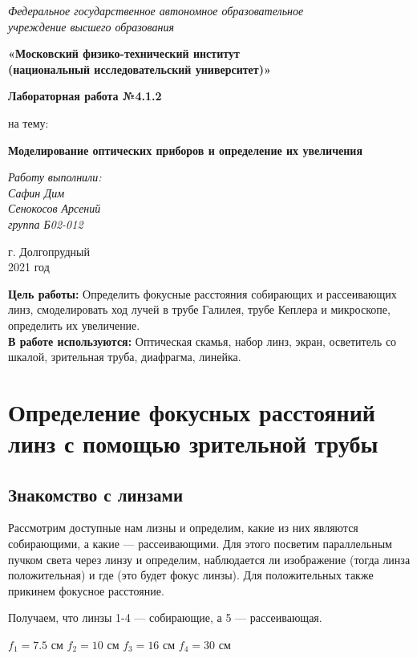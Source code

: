 \documentclass[a4paper,12pt]{article} %
\date{\today}
\begin{document}
 
\begin{titlepage}
\begin{center}
		\textit{\large {Федеральное государственное автономное образовательное\\ учреждение высшего образования} }
		\vspace{0.5ex}
			
		\textbf{\large {«Московский физико-технический институт\\ (национальный исследовательский университет)»}}
	\end{center}
	\vspace{10ex}
	\begin{center}
		\vspace{13ex}
		\textbf{\Large {Лабораторная работа №4.1.2}}
			
		\Large{на тему:}
		\vspace{1ex}
			
		\textbf{\Large {Моделирование оптических приборов и определение их увеличения}}
			
		\vspace{42ex}
		\begin{flushright}
			\noindent
			\textit{Работу выполнили:}
			\\
			\textit{Сафин Дим\\ Сенокосов Арсений\\ группа Б02-012}
		\end{flushright}
		\vfill
		г. Долгопрудный \\2021 год
	\end{center}
\end{titlepage}

\textbf{Цель работы:} Определить фокусные расстояния собирающих и рассеивающих линз, смоделировать ход лучей в трубе Галилея, трубе Кеплера и микроскопе, определить их увеличение.\\
\textbf{В работе используются:} Оптическая скамья, набор линз, экран, осветитель со шкалой, зрительная труба, диафрагма, линейка.

\section*{Определение фокусных расстояний линз с помощью зрительной трубы}
\subsection*{Знакомство с линзами}
Рассмотрим доступные нам лизны и определим, какие из них являются собирающими, а какие --- рассеивающими. Для этого посветим параллельным пучком света через линзу и определим, наблюдается ли изображение (тогда линза положительная) и где (это будет фокус линзы). Для положительных также прикинем фокусное расстояние.
\par Получаем, что линзы 1-4 --- собирающие, а 5 --- рассеивающая. \par
\begin{center}
    $f_1 = 7.5$ см \hspace{1cm}  $f_2 = 10$ см \hspace{1cm}  $f_3 = 16$ см\hspace{1cm}  $f_4 = 30$ см
\end{center}
\end{document}

